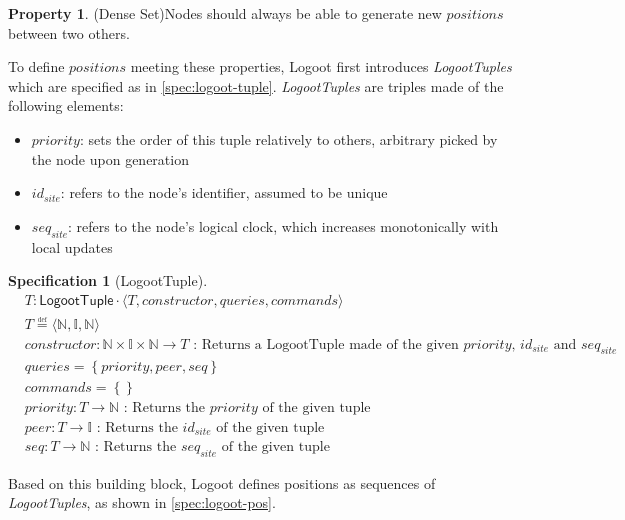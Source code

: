 \documentclass{article}
\newcommand{\commands}[1]{commands = \set{#1}}
\newcommand{\defeq}{\overset{\underset{\mathrm{def}}{}}{=}}
\newcommand{\fnspec}[3]{#1: #2 \text{ : #3}}
\newcommand{\queries}[1]{queries = \set{#1}}
\newcommand{\set}[1]{\left\{#1\right\}} %
\newcommand{\spectuple}[1]{\tuple{#1, constructor, queries, commands}}
\newcommand{\tuple}[1]{\langle #1 \rangle}
\theoremstyle{definition}
\theoremstyle{definition}
\newcounter{propertycounter}
\theoremstyle{definition}
\newtheorem{property}[propertycounter]{Property}
\newcounter{specificationcounter}
\theoremstyle{definition}
\newtheorem{specification}[specificationcounter]{Specification}
\begin{document}
\begin{property}(Dense Set)\label{prop:dense-set}
    Nodes should always be able to generate new $positions$ between two others.
\end{property}

To define $positions$ meeting these properties, Logoot first introduces \emph{LogootTuples} which are specified as in \autoref{spec:logoot-tuple}.
\emph{LogootTuples} are triples made of the following elements:
\begin{itemize}
    \item $priority$: sets the order of this tuple relatively to others, arbitrary picked by the node upon generation
    \item $id_{site}$: refers to the node's identifier, assumed to be unique
    \item $seq_{site}$: refers to the node's logical clock, which increases monotonically with local updates
\end{itemize}

\begin{specification}[LogootTuple]
    \begin{align*}
    &T: \mathsf{LogootTuple} \cdot \spectuple{T}\\
    &T \defeq \tuple{\mathbb{N}, \mathbb{I}, \mathbb{N}}\\
    &\fnspec{constructor}{\mathbb{N} \times \mathbb{I} \times \mathbb{N} \to T}{Returns a LogootTuple made of the given $priority$, $id_{site}$ and $seq_{site}$}\\
    &\queries{priority, peer, seq}\\
    &\commands{}\\
    &\fnspec{priority}{T \to \mathbb{N}}{Returns the $priority$ of the given tuple}\\
    &\fnspec{peer}{T \to \mathbb{I}}{Returns the $id_{site}$ of the given tuple}\\
    &\fnspec{seq}{T \to \mathbb{N}}{Returns the $seq_{site}$ of the given tuple}
    \end{align*}
    \label{spec:logoot-tuple}
\end{specification}

Based on this building block, Logoot defines positions as sequences of \emph{LogootTuples}, as shown in \autoref{spec:logoot-pos}.
\end{document}
